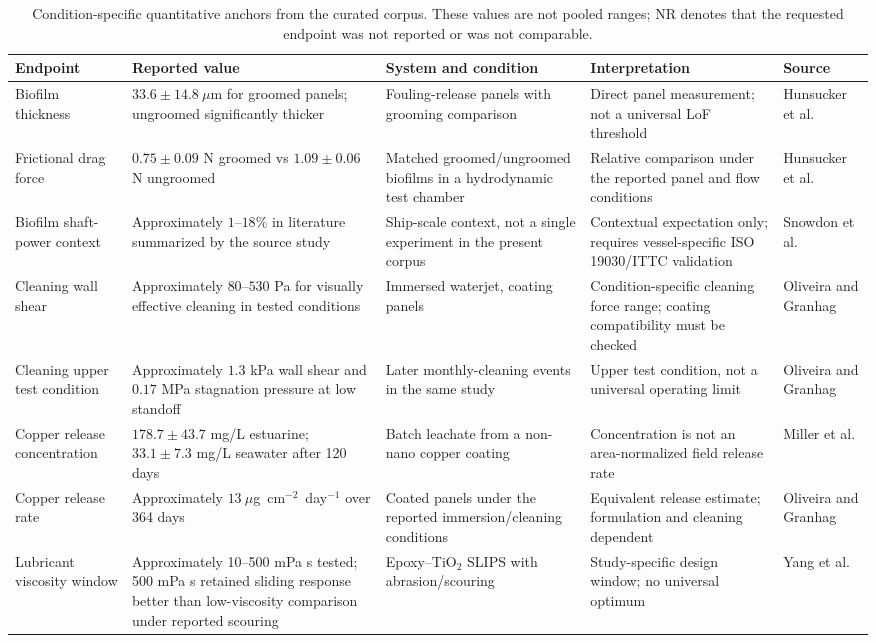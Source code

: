\begin{table}[t]
\centering
\caption{Condition-specific quantitative anchors from the curated corpus. These values are not pooled ranges; NR denotes that the requested endpoint was not reported or was not comparable.}
\label{tab:quantitative_anchors}
\small
\begin{tabularx}{\textwidth}{l l l X X}
\toprule
Endpoint & Reported value & System and condition & Interpretation & Source \\
\midrule
Biofilm thickness & $33.6\pm14.8~\mu$m for groomed panels; ungroomed significantly thicker & Fouling-release panels with grooming comparison & Direct panel measurement; not a universal LoF threshold & Hunsucker et al. \\
Frictional drag force & $0.75\pm0.09$ N groomed vs $1.09\pm0.06$ N ungroomed & Matched groomed/ungroomed biofilms in a hydrodynamic test chamber & Relative comparison under the reported panel and flow conditions & Hunsucker et al. \\
Biofilm shaft-power context & Approximately $1$--$18\%$ in literature summarized by the source study & Ship-scale context, not a single experiment in the present corpus & Contextual expectation only; requires vessel-specific ISO 19030/ITTC validation & Snowdon et al. \\
Cleaning wall shear & Approximately $80$--$530$ Pa for visually effective cleaning in tested conditions & Immersed waterjet, coating panels & Condition-specific cleaning force range; coating compatibility must be checked & Oliveira and Granhag \\
Cleaning upper test condition & Approximately $1.3$ kPa wall shear and $0.17$ MPa stagnation pressure at low standoff & Later monthly-cleaning events in the same study & Upper test condition, not a universal operating limit & Oliveira and Granhag \\
Copper release concentration & $178.7\pm43.7$ mg/L estuarine; $33.1\pm7.3$ mg/L seawater after 120 days & Batch leachate from a non-nano copper coating & Concentration is not an area-normalized field release rate & Miller et al. \\
Copper release rate & Approximately $13~\mu$g~cm$^{-2}$~day$^{-1}$ over 364 days & Coated panels under the reported immersion/cleaning conditions & Equivalent release estimate; formulation and cleaning dependent & Oliveira and Granhag \\
Lubricant viscosity window & Approximately 10--500 mPa s tested; 500 mPa s retained sliding response better than low-viscosity comparison under reported scouring & Epoxy--TiO$_2$ SLIPS with abrasion/scouring & Study-specific design window; no universal optimum & Yang et al. \\

\end{tabularx}
\end{table}
